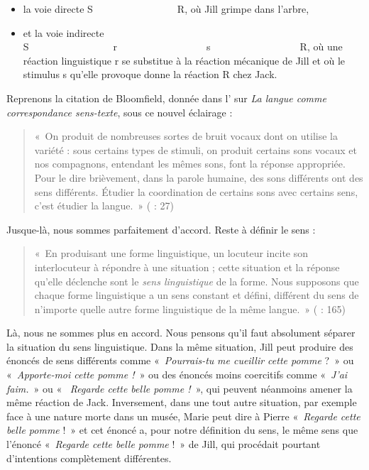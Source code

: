 \begin{itemize}
\item %
la voie directe S~~~~~~~~~~~~~~~~~R, où Jill grimpe dans l’arbre,
\item %
et la voie indirecte S~~~~~~~~~~~~~~~~~r~~~~~~~~~~~~~~~~~~s~~~~~~~~~~~~~~~~~~R, où une réaction linguistique r se substitue à la réaction mécanique de Jill et où le stimulus s qu’elle provoque donne la réaction R chez Jack.
\end{itemize}

Reprenons la citation de Bloomfield, donnée dans l’ sur \textit{La langue comme correspondance sens-texte}, sous ce nouvel éclairage :

\begin{quote}
    «~On produit de nombreuses sortes de bruit vocaux dont on utilise la variété : sous certains types de stimuli, on produit certains sons vocaux et nos compagnons, entendant les mêmes sons, font la réponse appropriée. Pour le dire brièvement, dans la parole humaine, des sons différents ont des sens différents. Étudier la coordination de certains sons avec certains sens, c’est étudier la langue.~» (\citealt{Bloomfield1933} : 27)
\end{quote}

Jusque-là, nous sommes parfaitement d’accord. Reste à définir le sens :

\begin{quote}
    «~En produisant une forme linguistique, un locuteur incite son interlocuteur à répondre à une situation ; cette situation et la réponse qu’elle déclenche sont le \textit{sens linguistique} de la forme. Nous supposons que chaque forme linguistique a un sens constant et défini, différent du sens de n’importe quelle autre forme linguistique de la même langue.~» (\citealt{Bloomfield1933} : 165)
\end{quote}

Là, nous ne sommes plus en accord. Nous pensons qu’il faut absolument séparer la situation du sens linguistique. Dans la même situation, Jill peut produire des énoncés de sens différents comme «~\textit{Pourrais-tu} \textit{me cueillir cette pomme} ?~» ou «~\textit{Apporte-moi cette pomme !~}» ou des énoncés moins coercitifs comme «~\textit{J’ai faim.}~» ou «~ \textit{Regarde cette belle pomme !~}», qui peuvent néanmoins amener la même réaction de Jack. Inversement, dans une tout autre situation, par exemple face à une nature morte dans un musée, Marie peut dire à Pierre «~\textit{Regarde cette belle pomme} !~» et cet énoncé a, pour notre définition du sens, le même sens que l’énoncé «~\textit{Regarde cette belle pomme} !~» de Jill, qui procédait pourtant d’intentions complètement différentes.

